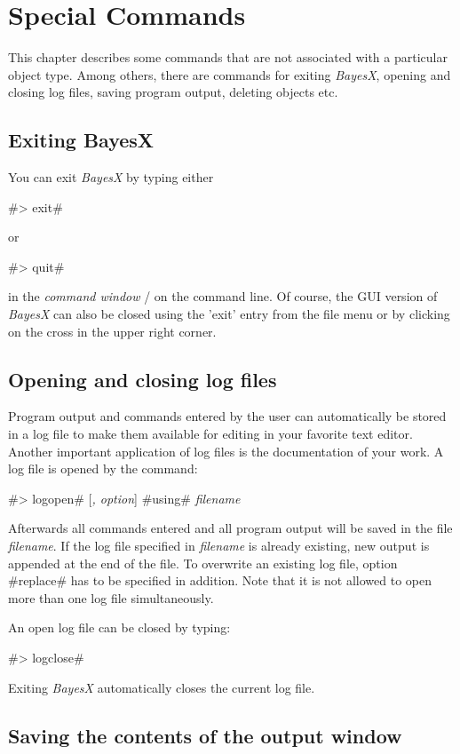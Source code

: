 \chapter{Special Commands}

This chapter describes some commands that are not associated with a particular object type. Among others, there are commands
for exiting {\em BayesX}, opening and closing log files, saving program output, deleting objects etc.

\section{Exiting BayesX}

You can exit {\em BayesX} by typing either

#> exit#

or

#> quit#

in the {\em command window} / on the command line. Of course, the GUI version of {\em BayesX} can also be closed using the
'exit' entry from the file menu or by clicking on the cross in the upper right corner.

\section{Opening and closing log files} \label{logfile}

Program output and commands entered by the user can automatically be stored in a log file to make them available for editing in
your favorite text editor. Another important application of log files is the documentation of your work. A log file is opened
by the command:

#> logopen# [{\em, option}] #using# {\em filename}

Afterwards all commands entered and all program output will be saved in the file {\em filename}. If the log file specified in
{\em filename} is already existing, new output is appended at the end of the file. To overwrite an existing log file, option
#replace# has to be specified in addition. Note that it is not allowed to open more than one log file simultaneously.

An open log file can be closed by typing:

#> logclose#

Exiting {\em BayesX} automatically closes the current log file.

\section{Saving the contents of the output window}
 

